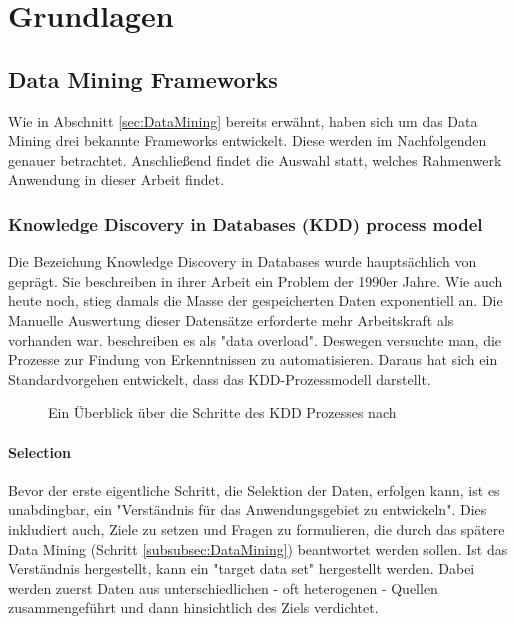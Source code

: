 \chapter{Grundlagen}

\section{Data Mining Frameworks}
Wie in Abschnitt \ref{sec:DataMining} bereits erwähnt, haben sich um das Data Mining drei bekannte Frameworks entwickelt. Diese werden im Nachfolgenden genauer betrachtet. Anschließend findet die Auswahl statt, welches Rahmenwerk Anwendung in dieser Arbeit findet.

\subsection{Knowledge Discovery in Databases (KDD) process model}
Die Bezeichung Knowledge Discovery in Databases wurde hauptsächlich von \citep{fayyad_data_1996} geprägt. Sie beschreiben in ihrer Arbeit ein Problem der 1990er Jahre. Wie auch heute noch, stieg damals die Masse der gespeicherten Daten exponentiell  an. Die Manuelle Auswertung dieser Datensätze erforderte mehr Arbeitskraft als vorhanden war. \citep[S.~38]{fayyad_data_1996} beschreiben es als "data overload". Deswegen versuchte man, die Prozesse zur Findung von Erkenntnissen zu automatisieren. Daraus hat sich ein Standardvorgehen entwickelt, dass das KDD-Prozessmodell darstellt.
\begin{figure}[H]
\caption{Ein Überblick über die Schritte des KDD Prozesses nach \citep[S.~41]{fayyad_data_1996}}
\label{fig:kddprocess}
\centering
\end{figure}


\subsubsection{Selection}
Bevor der erste eigentliche Schritt, die Selektion der Daten, erfolgen kann, ist es unabdingbar, ein "Verständnis für das Anwendungsgebiet zu entwickeln".\citep[S.~42; eigene Übersetzung]{fayyad_data_1996} Dies inkludiert auch, Ziele zu setzen und Fragen zu formulieren, die durch das spätere Data Mining (Schritt \ref{subsubsec:DataMining}) beantwortet werden sollen.  Ist das Verständnis hergestellt, kann ein "target data set"\citep[S.~42]{fayyad_data_1996} hergestellt werden. Dabei werden zuerst Daten aus unterschiedlichen - oft heterogenen - Quellen zusammengeführt und dann hinsichtlich des Ziels verdichtet.\citep[S.~70]{swamynathan_mastering_2017}


